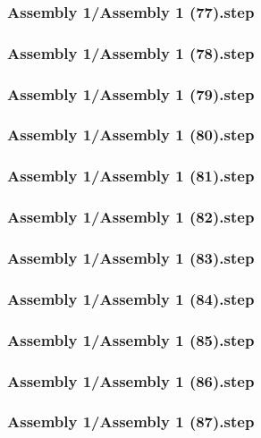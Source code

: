 \documentclass[a4paper,12pt]{article}
\begin{document}
\begin{lstlising}[language=C++]
\subsubsection{Assembly 1/Assembly 1 (77).step}

\subsubsection{Assembly 1/Assembly 1 (78).step}

\subsubsection{Assembly 1/Assembly 1 (79).step}

\subsubsection{Assembly 1/Assembly 1 (80).step}

\subsubsection{Assembly 1/Assembly 1 (81).step}

\subsubsection{Assembly 1/Assembly 1 (82).step}

\subsubsection{Assembly 1/Assembly 1 (83).step}

\subsubsection{Assembly 1/Assembly 1 (84).step}

\subsubsection{Assembly 1/Assembly 1 (85).step}

\subsubsection{Assembly 1/Assembly 1 (86).step}

\subsubsection{Assembly 1/Assembly 1 (87).step}


\end{lstlising}
\end{document}

